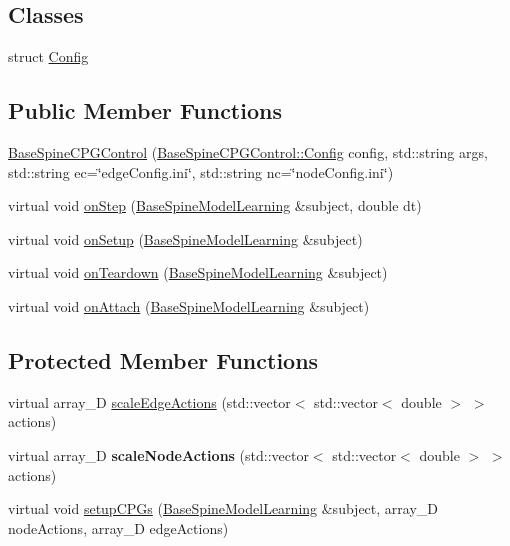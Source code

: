 \subsection*{Classes}
\begin{DoxyCompactItemize}
\item 
struct \hyperlink{struct_base_spine_c_p_g_control_1_1_config}{Config}
\end{DoxyCompactItemize}
\subsection*{Public Member Functions}
\begin{DoxyCompactItemize}
\item 
\hyperlink{class_base_spine_c_p_g_control_a8f7e5cb05f7285725b535e2ee8483faf}{Base\-Spine\-C\-P\-G\-Control} (\hyperlink{struct_base_spine_c_p_g_control_1_1_config}{Base\-Spine\-C\-P\-G\-Control\-::\-Config} config, std\-::string args, std\-::string ec=\char`\"{}edge\-Config.\-ini\char`\"{}, std\-::string nc=\char`\"{}node\-Config.\-ini\char`\"{})
\item 
virtual void \hyperlink{class_base_spine_c_p_g_control_afa0b0e1f995545476511eac4fd322da2}{on\-Step} (\hyperlink{class_base_spine_model_learning}{Base\-Spine\-Model\-Learning} \&subject, double dt)
\item 
virtual void \hyperlink{class_base_spine_c_p_g_control_a25508234dbe960a6fea460d2abd6f353}{on\-Setup} (\hyperlink{class_base_spine_model_learning}{Base\-Spine\-Model\-Learning} \&subject)
\item 
virtual void \hyperlink{class_base_spine_c_p_g_control_aa209e0699b3dfc5889c6084409be4d20}{on\-Teardown} (\hyperlink{class_base_spine_model_learning}{Base\-Spine\-Model\-Learning} \&subject)
\item 
virtual void \hyperlink{classtg_observer_a0ecd07483eb41f9a0ab19b8ed24052f1}{on\-Attach} (\hyperlink{class_base_spine_model_learning}{Base\-Spine\-Model\-Learning} \&subject)
\end{DoxyCompactItemize}
\subsection*{Protected Member Functions}
\begin{DoxyCompactItemize}
\item 
virtual array\-\_\-D \hyperlink{class_base_spine_c_p_g_control_afe859425b72dcacf780647676571045b}{scale\-Edge\-Actions} (std\-::vector$<$ std\-::vector$<$ double $>$ $>$ actions)
\item 
\hypertarget{class_base_spine_c_p_g_control_a69503b94c6783d03efcfc962c4dc8c92}{virtual array\-\_\-D {\bfseries scale\-Node\-Actions} (std\-::vector$<$ std\-::vector$<$ double $>$ $>$ actions)}\label{class_base_spine_c_p_g_control_a69503b94c6783d03efcfc962c4dc8c92}

\item 
virtual void \hyperlink{class_base_spine_c_p_g_control_a4f54eecdac3f19693752a77a8668f119}{setup\-C\-P\-Gs} (\hyperlink{class_base_spine_model_learning}{Base\-Spine\-Model\-Learning} \&subject, array\-\_\-D node\-Actions, array\-\_\-D edge\-Actions)
\end{DoxyCompactItemize}
